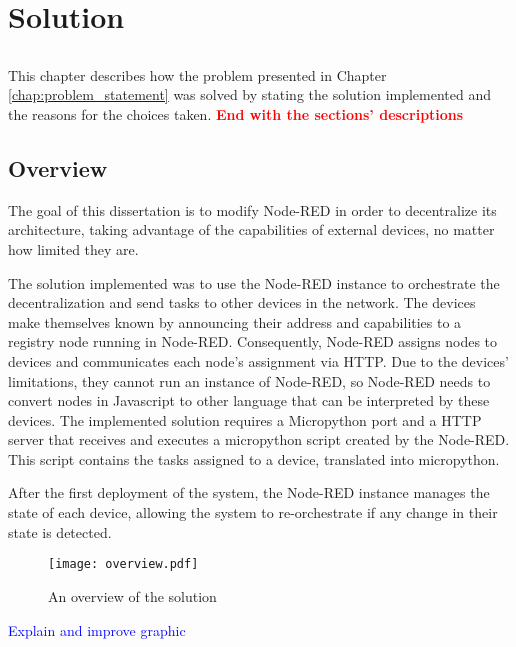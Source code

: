 \chapter{Solution} \label{chap:solution} \minitoc

\section*{}

This chapter describes how the problem presented in Chapter \ref{chap:problem_statement} was solved by stating the solution implemented and the reasons for the choices taken.  \textbf{\textcolor{red}{End with the sections' descriptions}}

\section{Overview}\label{sec:solution_overview}

The goal of this dissertation is to modify Node-RED in order to decentralize its architecture, taking advantage of the capabilities of external devices, no matter how limited they are.

The solution implemented was to use the Node-RED instance to orchestrate the decentralization and send tasks to other devices in the network. The devices make themselves known by announcing their address and capabilities to a registry node running in Node-RED. Consequently, Node-RED assigns nodes to devices and communicates each node's assignment via HTTP. Due to the devices' limitations, they cannot run an instance of Node-RED, so Node-RED needs to convert nodes in Javascript to other language that can be interpreted by these devices. The implemented solution requires a Micropython port and a HTTP server that receives and executes a micropython script created by the Node-RED. This script contains the tasks assigned to a device, translated into micropython. 

After the first deployment of the system, the Node-RED instance manages the state of each device, allowing the system to re-orchestrate if any change in their state is detected.

\begin{figure}[h]
\centering
\texttt{[image: overview.pdf]}
\caption[Solution's overview]{An overview of the solution}\label{fig:solution_overview}
\end{figure}

\textcolor{blue}{Explain and improve graphic}


